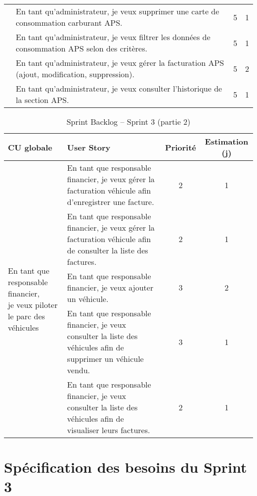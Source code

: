 \documentclass[a4paper,11pt]{report}
\begin{document}
\begin{table}[htbp]
\begin{tabular}{|p{3.5cm}|p{8cm}|c|c|}
    & En tant qu'administrateur, je veux supprimer une carte de consommation carburant APS. 
      & 5 & 1 \\ \cline{2-4}
    & En tant qu'administrateur, je veux filtrer les données de consommation APS selon des critères. 
      & 5 & 1 \\ \cline{2-4}
    & En tant qu'administrateur, je veux gérer la facturation APS (ajout, modification, suppression). 
      & 5 & 2 \\ \cline{2-4}
    & En tant qu'administrateur, je veux consulter l’historique de la section APS. 
      & 5 & 1 \\
    \hline
  \end{tabular}
\end{table}

\newpage

\begin{table}[htbp]
  \ContinuedFloat
  \centering
  \caption{Sprint Backlog – Sprint 3 (partie 2)}
  \label{tab:sprint3-backlog-part2}
  \begin{tabular}{|p{3.5cm}|p{8cm}|c|c|}
    \hline
    \textbf{CU globale} 
      & \textbf{User Story} 
      & \textbf{Priorité} 
      & \textbf{Estimation (j)} \\ 
    \hline
    \multirow{5}{=}{\parbox{3.5cm}{En tant que responsable financier,\\je veux piloter le parc des véhicules}} 
      & En tant que responsable financier, je veux gérer la facturation véhicule afin d’enregistrer une facture. 
      & 2 & 1 \\ \cline{2-4}
    & En tant que responsable financier, je veux gérer la facturation véhicule afin de consulter la liste des factures. 
      & 2 & 1 \\ \cline{2-4}
    & En tant que responsable financier, je veux ajouter un véhicule. 
      & 3 & 2 \\ \cline{2-4}
    & En tant que responsable financier, je veux consulter la liste des véhicules afin de supprimer un véhicule vendu. 
      & 3 & 1 \\ \cline{2-4}
    & En tant que responsable financier, je veux consulter la liste des véhicules afin de visualiser leurs factures. 
      & 2 & 1 \\
    \hline
  \end{tabular}
\end{table}

\section{Spécification des besoins du Sprint 3}
\end{document}
